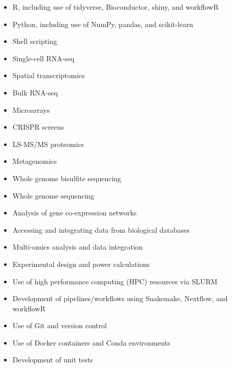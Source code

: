 \documentclass[10pt,a4paper,ragged2e,withhyper]{altacv2}
\begin{document}
\begin{paracol}{2}

\begin{itemize}
    \item R, including use of tidyverse, Bioconductor, shiny, and workflowR
    \item Python, including use of NumPy, pandas, and scikit-learn
    \item Shell scripting
\end{itemize}
\medskip

\begin{itemize}
    \item Single-cell RNA-seq
    \item Spatial transcriptomics
    \item Bulk RNA-seq
    \item Microarrays
    \item CRISPR screens
    \item LS-MS/MS proteomics
    \item Metagenomics
    \item Whole genome bisulfite sequencing
    \item Whole genome sequencing
    \item Analysis of gene co-expression networks
    \item Accessing and integrating data from biological databases
    \item Multi-omics analysis and data integration
    \item Experimental design and power calculations
\end{itemize}
\medskip

\begin{itemize}
    \item Use of high performance computing (HPC) resources via SLURM
    \item Development of pipelines/workflows using Snakemake, Nextflow, and workflowR
    \item Use of Git and version control
    \item Use of Docker containers and Conda environments
    \item Development of unit tests
\end{itemize}
\medskip

\switchcolumn


\end{paracol}
\end{document}

